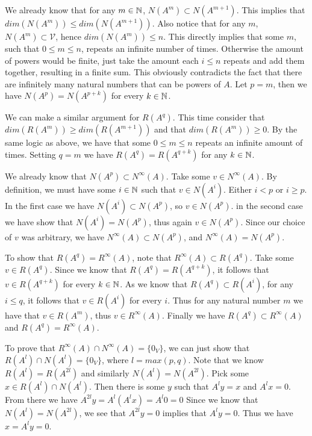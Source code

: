 \documentclass{article}
\begin{document}
\begin{solution}
  We already know that for any $m \in \mathbb{N}$, $N(A^m) \subset N(A^{m + 1})$.
  This implies that $dim(N(A^m)) \le dim(N(A^{m + 1}))$.
  Also notice that for any $m$, $N(A^m) \subset \mathcal{V}$, hence $dim(N(A^m)) \le n$.
  This directly implies that some $m$, such that $0 \le m \le n$, repeats an infinite number of times.
  Otherwise the amount of powers would be finite, just take the amount each $i \le n$ repeats and add them together, resulting in a finite sum.
  This obviously contradicts the fact that there are infinitely many natural numbers that can be powers of $A$.
  Let $p = m$, then we have $N(A^p) = N(A^{p + k})$ for every $k \in \mathbb{N}$.

  We can make a similar argument for $R(A^q)$.
  This time consider that $dim(R(A^m)) \ge dim(R(A^{m + 1}))$ and that $dim(R(A^m)) \ge 0$.
  By the same logic as above, we have that some $0 \le m \le n$ repeats an infinite amount of times.
  Setting $q = m$ we have $R(A^q) = R(A^{q + k})$ for any $k \in \mathbb{N}$.


  We already know that $N(A^p) \subset N^{\infty}(A)$.
  Take some $v \in N^{\infty}(A)$.
  By definition, we must have some $i \in \mathbb{N}$ such that $v \in N(A^i)$.
  Either $i < p$ or $i \ge p$.
  In the first case we have $N(A^i) \subset N(A^p)$, so $v \in N(A^p)$.
  in the second case we have show that $N(A^i) = N(A^p)$, thus again $v \in N(A^p)$.
  Since our choice of $v$ was arbitrary, we have $N^{\infty}(A) \subset N(A^p)$, and $N^{\infty}(A) = N(A^p)$.

  To show that $R(A^q) = R^{\infty}(A)$, note that $R^{\infty}(A) \subset R(A^q)$.
  Take some $v \in R(A^q)$.
  Since we know that $R(A^q) = R(A^{q + k})$, it follows that $v \in R(A^{q + k})$ for every $k \in \mathbb{N}$.
  As we know that $R(A^q) \subset R(A^i)$, for any $i \le q$, it follows that $v \in R(A^i)$ for every $i$.
  Thus for any natural number $m$ we have that $v \in R(A^m)$, thus $v \in R^{\infty}(A)$.
  Finally we have $R(A^q) \subset R^{\infty}(A)$ and $R(A^q) = R^{\infty}(A)$.


  To prove that $R^{\infty}(A) \cap N^{\infty}(A) = \{0_V\}$, we can just show that $R(A^l) \cap N(A^l) = \{0_V\}$, where $l = max(p, q)$.
  Note that we know $R(A^l) = R(A^{2 l})$ and similarly $N(A^l) = N(A^{2 l})$.
  Pick some $x \in R(A^l) \cap N(A^l)$.
  Then there is some $y$ such that $A^l y = x$ and $A^l x = 0$.
  From there we have $A^{2 l} y = A^l(A^l x) = A^l 0 = 0$ 
  Since we know that $N(A^l) = N(A^{2 l})$, we see that $A^{2 l} y = 0$ implies that $A^l y = 0$.
  Thus we have $x = A^l y = 0$.


\end{solution}
\end{document}
